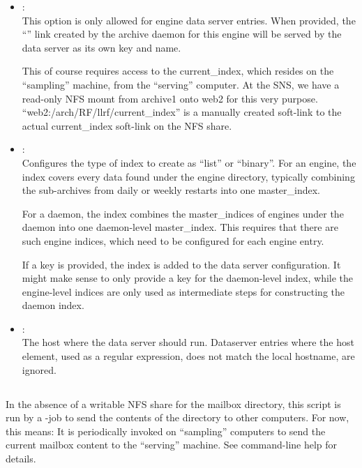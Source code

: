\begin{itemize}
\item {}:\\
      This option is only allowed for engine data server entries.
      When provided, the ``'' link created by the
      archive daemon for this engine will be served by the
      data server as its own key and name.

      This of course requires access to the current\_index, which
      resides on the ``sampling'' machine, from the ``serving''
      computer. At the SNS, we have a read-only NFS mount from
      archive1 onto web2 for this very purpose.
      ``web2:/arch/RF/llrf/current\_index'' is a manually
      created soft-link to the actual current\_index soft-link on the
      NFS share.
\item {}: \\
      Configures the type of index to create as ``list'' or ``binary''.
      For an engine, the index covers every data found under the engine
      directory, typically combining the sub-archives from daily or weekly
      restarts into one master\_index.

      For a daemon, the index combines the master\_indices of engines
      under the daemon into one daemon-level master\_index. This
      requires that there are such engine indices, which need to be
      configured for each engine entry.

      If a key is provided, the index is added to the data server
      configuration. It might make sense to only provide a key for the
      daemon-level index, while the engine-level indices are only used
      as intermediate steps for constructing the daemon index.            
\item {}: \\
      The host where the data server should run. Dataserver entries where
      the host element, used as a regular expression, does not match the
      local hostname, are ignored.
\end{itemize}

\subsection{}
In the absence of a writable NFS share for the mailbox directory,
this script is run by a -job to send the contents of the
 directory to other computers.
For now, this means: It is periodically invoked on ``sampling''
computers to send the current mailbox content to the ``serving''
machine. See command-line help for details.

